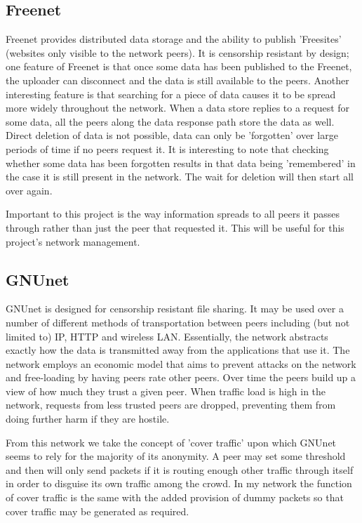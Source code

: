 \documentclass[ %
                    author={Luke Murray},
                supervisor={Dr. Simon Hollis},
                     title={Shadow Peer-to-Peer Networks},
                  subtitle={},
                    degree={MEng},
                      year={2013} ]{thesis}
\begin{document}
\subsection{Freenet}

Freenet\cite{Freenet} provides distributed data storage and the ability to publish 'Freesites' (websites only visible to the network peers). It is censorship resistant by design; one feature of Freenet is that once some data has been published to the Freenet, the uploader can disconnect and the data is still available to the peers. Another interesting feature is that searching for a piece of data causes it to be spread more widely throughout the network. When a data store replies to a request for some data, all the peers along the data response path store the data as well. Direct deletion of data is not possible, data can only be 'forgotten' over large periods of time if no peers request it. It is interesting to note that checking whether some data has been forgotten results in that data being 'remembered' in the case it is still present in the network. The wait for deletion will then start all over again.

Important to this project is the way information spreads to all peers it passes through rather than just the peer that requested it. This will be useful for this project's network management.

\subsection{GNUnet}

GNUnet\cite{GNUnet} is designed for censorship resistant file sharing. It may be used over a number of different methods of transportation between peers including (but not limited to) IP, HTTP and wireless LAN. Essentially, the network abstracts exactly how the data is transmitted away from the applications that use it. The network employs an economic model that aims to prevent attacks on the network and free-loading by having peers rate other peers. Over time the peers build up a view of how much they trust a given peer. When traffic load is high in the network, requests from less trusted peers are dropped, preventing them from doing further harm if they are hostile.

From this network we take the concept of 'cover traffic' upon which GNUnet seems to rely for the majority of its anonymity. A peer may set some threshold and then will only send packets if it is routing enough other traffic through itself in order to disguise its own traffic among the crowd. In my network the function of cover traffic is the same with the added provision of dummy packets so that cover traffic may be generated as required.
\end{document}
